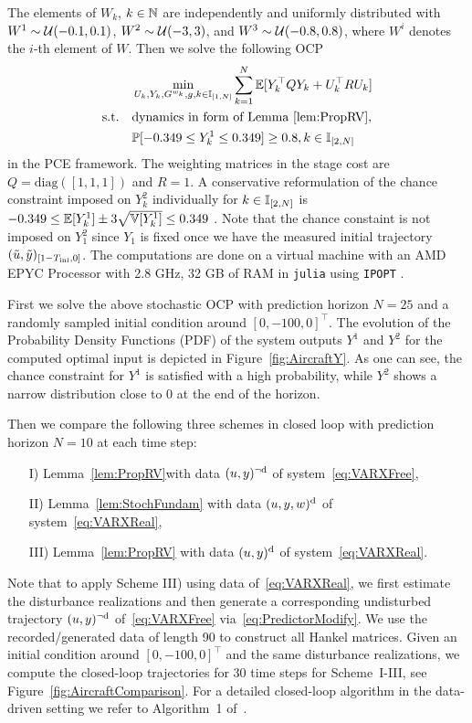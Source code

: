 The elements of $W_k$, $k\in \mathbb{N}$ are independently and uniformly distributed with $W^1\sim\mathcal{U}(-0.1,0.1)$, $W^2\sim\mathcal{U}(-3,3)$, and $W^3\sim\mathcal{U}(-0.8,0.8)$, where $W^i$ denotes the $i$-th element of $W$. Then we solve the following OCP
\begin{align*}
    &\min_{U_k, Y_k,G^{w_k}, g, k\in\mathbb{I}_{[1,N]}}
    \sum_{k=1}^N\mathbb{E}[Y_k^\top QY_k + U_k^\top R U_k]\\
    \text{s.t.}\quad &\text{dynamics in form of Lemma~\ref{lem:PropRV}},\\
    &\mathbb{P}[-0.349\leq Y_k^1\leq 0.349]\geq 0.8, k\in\mathbb{I}_{[2,N]}
\end{align*}
in the PCE framework. The weighting matrices in the stage cost are $Q=\text{diag}([1,1,1])$ and $R=1$. A conservative reformulation of the chance constraint imposed on $Y_k^2$ individually for $k\in\mathbb{I}_{[2,N]}$ is $-0.349\leq \mathbb{E}[Y_k^1] \pm 3\sqrt{\mathbb{V}[Y_k^1]}\leq 0.349$ \citep{calafiore06distributionally}. Note that the chance constaint is not imposed on $Y_1^2$ since $Y_1$ is fixed once we have the measured initial trajectory $(\tilde{u},\tilde{y})_{[1-T_\text{ini},0]}$. The computations are done on a virtual machine with an AMD EPYC Processor with 2.8 GHz, 32 GB of RAM in \texttt{julia} using \texttt{IPOPT} \citep{waechter06implementation}.

First we solve the above stochastic OCP with prediction horizon $N=25$ and a randomly sampled initial condition around $[0,-100,0]^\top$. The evolution of the Probability Density Functions (PDF) of the system outputs $Y^1$ and $Y^2$ for the computed optimal input is depicted in Figure~\ref{fig:AircraftY}. As one can see, the chance constraint for $Y^1$ is satisfied with a high probability, while $Y^2$ shows a narrow distribution close to 0 at the end of the horizon.

Then we compare the following three schemes in closed loop with prediction horizon $N=10$ at each time step:
\begin{itemize}
	\item[I)] Lemma~\ref{lem:PropRV}with data $(u,y)^{\neg\mathrm{d}}$ of system~\eqref{eq:VARXFree},
	\item[II)] Lemma~\ref{lem:StochFundam} with data $(u,y,w)^{\mathrm{d}}$ of system~\eqref{eq:VARXReal},
	\item[III)] Lemma~\ref{lem:PropRV} with data $(u,y)^{\mathrm{d}}$ of system~\eqref{eq:VARXReal}.
\end{itemize}
Note that to apply Scheme III) using data of~\eqref{eq:VARXReal}, we first estimate the disturbance realizations and then generate a corresponding undisturbed trajectory $(u,y)^{\neg\mathrm{d}}$ of~\eqref{eq:VARXFree} via~\eqref{eq:PredictorModify}. We use the recorded/generated data of length 90 to construct all Hankel matrices. Given an initial condition around $[0,-100,0]^\top$ and the same disturbance realizations, we compute the closed-loop trajectories for 30 time steps for Scheme~I-III, see Figure~\ref{fig:AircraftComparison}. For a detailed closed-loop algorithm in the data-driven setting we refer to Algorithm~1 of~\citet{pan23stochastic}.

